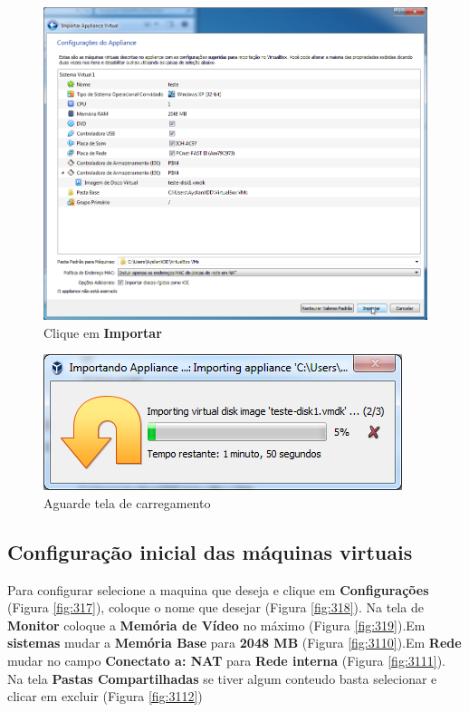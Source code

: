 \documentclass[10pt]{article}
\begin{document}
\begin{figure}[H]
    \centering
    \caption{Clique em \textbf{Importar}}
    \label{fig:35}
    \includegraphics[width=\linewidth]{images/ativacao_das_maquinas_virtuais/005.png}
\end{figure}
\begin{figure}[H]
    \centering
    \caption{Aguarde tela de carregamento}
    \label{fig:36}
    \includegraphics[width=\linewidth]{images/ativacao_das_maquinas_virtuais/006.png}
\end{figure}


\subsection{Configuração inicial das máquinas virtuais}
\par Para configurar selecione a maquina que deseja e clique em \textbf{Configurações} (Figura \ref{fig:317}), coloque o nome que desejar (Figura \ref{fig:318}). Na tela de \textbf{Monitor} coloque a \textbf{Memória de Vídeo} no máximo (Figura \ref{fig:319}).Em \textbf{sistemas} mudar a \textbf{Memória Base} para \textbf{2048 MB} (Figura \ref{fig:3110}).Em \textbf{Rede} mudar no campo \textbf{Conectato a: NAT} para \textbf{Rede interna} (Figura \ref{fig:3111}). Na tela \textbf{Pastas Compartilhadas} se tiver algum conteudo basta selecionar e clicar em excluir (Figura \ref{fig:3112})
\end{document}
